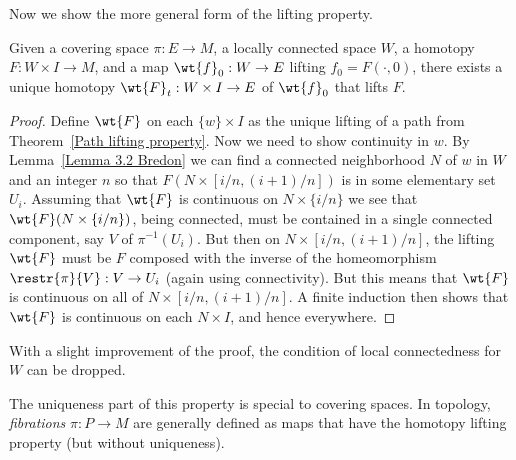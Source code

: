 Now we show the more general form of the lifting property.
\begin{thm}\label{homotopy lifting property}
    Given a covering space $\pi :E\to M$, a locally connected space $W$, a homotopy $F :W\times I\to M$, and a map $\wt{f}_0:W\to E$ lifting $f_0=F(\cdot ,0)$, there exists a unique homotopy $\wt{F}_t: W\times I\to E$ of $\wt{f}_0$ that lifts $F$.
\end{thm}
\begin{proof}
    Define $\wt{F}$ on each $\{w\}\times I$ as the unique lifting of a path from Theorem~\ref{Path lifting property}. Now we need to show continuity in $w$. By Lemma~\ref{Lemma 3.2 Bredon} we can find a connected neighborhood $N$ of $w$ in $W$ and an integer $n$ so that $F(N\times [i/n,(i+1)/n])$ is in some elementary set $U_i$. Assuming that $\wt{F}$ is continuous on $N\times \{i/n\}$ we see that $\wt{F}(N\times\{i/n\})$, being connected, must be contained in a  single connected component, say $V$ of $\pi^{-1}(U_i)$. But then on $N\times[i/n,(i+1)/n]$, the lifting $\wt{F}$ must be $F$ composed with the inverse of the homeomorphism $\restr{\pi}{V}:V\to U_i$ (again using connectivity). But this means that $\wt{F}$ is continuous on all of $N\times [i/n,(i+1)/n]$. A finite induction then shows that $\wt{F}$ is continuous on each $N\times I$, and hence everywhere.
\end{proof}
\begin{rem}
    With a slight improvement of the proof, the condition of local connectedness for $W$ can be dropped.
\end{rem}

The uniqueness part of this property is special to covering spaces. In topology, \emph{fibrations} $\pi: P\to M$  are generally defined as maps that have the homotopy lifting property (but without uniqueness).

